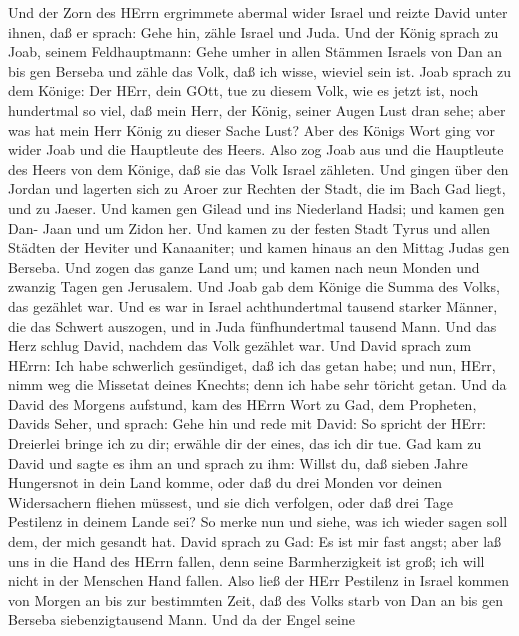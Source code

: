  Und der Zorn des HErrn ergrimmete abermal wider Israel und
reizte David unter ihnen, daß er sprach: Gehe hin, zähle Israel und
Juda.  Und der König sprach zu Joab, seinem Feldhauptmann:
Gehe umher in allen Stämmen Israels von Dan an bis gen Berseba und zähle
das Volk, daß ich wisse, wieviel sein ist.  Joab sprach zu
dem Könige: Der HErr, dein GOtt, tue zu diesem Volk, wie es jetzt ist,
noch hundertmal so viel, daß mein Herr, der König, seiner Augen Lust
dran sehe; aber was hat mein Herr König zu dieser Sache Lust?
 Aber des Königs Wort ging vor wider Joab und die Hauptleute
des Heers. Also zog Joab aus und die Hauptleute des Heers von dem
Könige, daß sie das Volk Israel zähleten.  Und gingen über
den Jordan und lagerten sich zu Aroer zur Rechten der Stadt, die im Bach
Gad liegt, und zu Jaeser.  Und kamen gen Gilead und ins
Niederland Hadsi; und kamen gen Dan- Jaan und um Zidon her. 
Und kamen zu der festen Stadt Tyrus und allen Städten der Heviter und
Kanaaniter; und kamen hinaus an den Mittag Judas gen Berseba.
 Und zogen das ganze Land um; und kamen nach neun Monden und
zwanzig Tagen gen Jerusalem.  Und Joab gab dem Könige die
Summa des Volks, das gezählet war. Und es war in Israel achthundertmal
tausend starker Männer, die das Schwert auszogen, und in Juda
fünfhundertmal tausend Mann.  Und das Herz schlug David,
nachdem das Volk gezählet war. Und David sprach zum HErrn: Ich habe
schwerlich gesündiget, daß ich das getan habe; und nun, HErr, nimm weg
die Missetat deines Knechts; denn ich habe sehr töricht getan.
 Und da David des Morgens aufstund, kam des HErrn Wort zu
Gad, dem Propheten, Davids Seher, und sprach:  Gehe hin und
rede mit David: So spricht der HErr: Dreierlei bringe ich zu dir;
erwähle dir der eines, das ich dir tue.  Gad kam zu David
und sagte es ihm an und sprach zu ihm: Willst du, daß sieben Jahre
Hungersnot in dein Land komme, oder daß du drei Monden vor deinen
Widersachern fliehen müssest, und sie dich verfolgen, oder daß drei Tage
Pestilenz in deinem Lande sei? So merke nun und siehe, was ich wieder
sagen soll dem, der mich gesandt hat.  David sprach zu Gad:
Es ist mir fast angst; aber laß uns in die Hand des HErrn fallen, denn
seine Barmherzigkeit ist groß; ich will nicht in der Menschen Hand
fallen.  Also ließ der HErr Pestilenz in Israel kommen von
Morgen an bis zur bestimmten Zeit, daß des Volks starb von Dan an bis
gen Berseba siebenzigtausend Mann.  Und da der Engel seine
